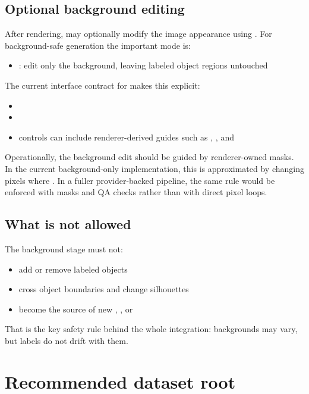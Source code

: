 \subsection{Optional background editing}

After rendering,  may optionally modify the image appearance using . For background-safe generation the important mode is:
\begin{itemize}
  \item {}: edit only the background, leaving labeled object regions untouched
\end{itemize}

The current interface contract for  makes this explicit:
\begin{itemize}
  \item {}
  \item {}
  \item controls can include renderer-derived guides such as , , and 
\end{itemize}

Operationally, the background edit should be guided by renderer-owned masks. In the current background-only implementation, this is approximated by changing pixels where . In a fuller provider-backed pipeline, the same rule would be enforced with masks and QA checks rather than with direct pixel loops.

\subsection{What is not allowed}

The background stage must not:
\begin{itemize}
  \item add or remove labeled objects
  \item cross object boundaries and change silhouettes
  \item become the source of new , , or 
\end{itemize}

That is the key safety rule behind the whole integration: backgrounds may vary, but labels do not drift with them.

\section{Recommended dataset root}

